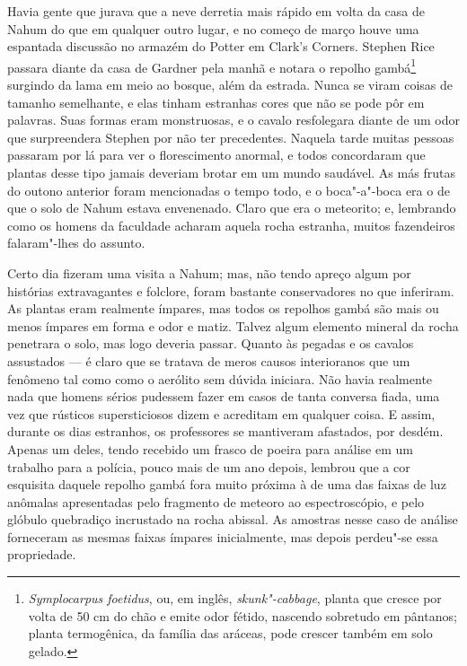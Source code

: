 Havia gente que jurava que a neve derretia mais rápido em volta da casa
de Nahum do que em qualquer outro lugar, e no começo de março houve uma
espantada discussão no armazém do Potter em Clark's Corners. Stephen
Rice passara diante da casa de Gardner pela manhã e notara o repolho
gambá\footnote{\emph{Symplocarpus foetidus}, ou, em inglês,
  \emph{skunk"-cabbage}, planta que cresce por volta de 50 cm do chão e
  emite odor fétido, nascendo sobretudo em pântanos; planta termogênica,
  da família das aráceas, pode crescer também em solo gelado.} surgindo
da lama em meio ao bosque, além da estrada. Nunca se viram coisas de
tamanho semelhante, e elas tinham estranhas cores que não se pode pôr em
palavras. Suas formas eram monstruosas, e o cavalo resfolegara diante de
um odor que surpreendera Stephen por não ter precedentes. Naquela tarde
muitas pessoas passaram por lá para ver o florescimento anormal, e todos
concordaram que plantas desse tipo jamais deveriam brotar em um mundo
saudável. As más frutas do outono anterior foram mencionadas o tempo
todo, e o boca"-a"-boca era o de que o solo de Nahum estava envenenado.
Claro que era o meteorito; e, lembrando como os homens da faculdade
acharam aquela rocha estranha, muitos fazendeiros falaram"-lhes do
assunto.

Certo dia fizeram uma visita a Nahum; mas, não tendo apreço algum por
histórias extravagantes e folclore, foram bastante conservadores no que
inferiram. As plantas eram realmente ímpares, mas todos os repolhos
gambá são mais ou menos ímpares em forma e odor e matiz. Talvez algum
elemento mineral da rocha penetrara o solo, mas logo deveria passar.
Quanto às pegadas e os cavalos assustados --- é claro que se tratava de
meros causos interioranos que um fenômeno tal como como o aerólito sem
dúvida iniciara. Não havia realmente nada que homens sérios pudessem
fazer em casos de tanta conversa fiada, uma vez que rústicos
supersticiosos dizem e acreditam em qualquer coisa. E assim, durante os
dias estranhos, os professores se mantiveram afastados, por desdém.
Apenas um deles, tendo recebido um frasco de poeira para análise em um
trabalho para a polícia, pouco mais de um ano depois, lembrou que a cor
esquisita daquele repolho gambá fora muito próxima à de uma das faixas
de luz anômalas apresentadas pelo fragmento de meteoro ao
espectroscópio, e pelo glóbulo quebradiço incrustado na rocha abissal.
As amostras nesse caso de análise forneceram as mesmas faixas ímpares
inicialmente, mas depois perdeu"-se essa propriedade.

